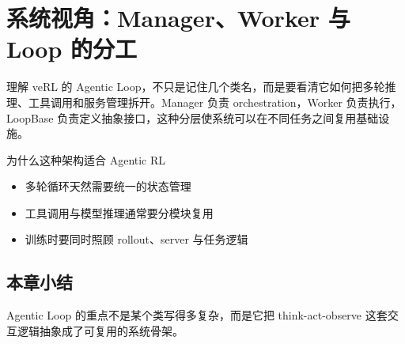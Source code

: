 \section{系统视角：Manager、Worker 与 Loop 的分工}
理解 veRL 的 Agentic Loop，不只是记住几个类名，而是要看清它如何把多轮推理、工具调用和服务管理拆开。Manager 负责 orchestration，Worker 负责执行，LoopBase 负责定义抽象接口，这种分层使系统可以在不同任务之间复用基础设施。

\begin{knowledgebox}{为什么这种架构适合 Agentic RL}
\begin{itemize}
  \item 多轮循环天然需要统一的状态管理
  \item 工具调用与模型推理通常要分模块复用
  \item 训练时要同时照顾 rollout、server 与任务逻辑
\end{itemize}
\end{knowledgebox}

\subsection{本章小结}
Agentic Loop 的重点不是某个类写得多复杂，而是它把 think-act-observe 这套交互逻辑抽象成了可复用的系统骨架。

\newpage
